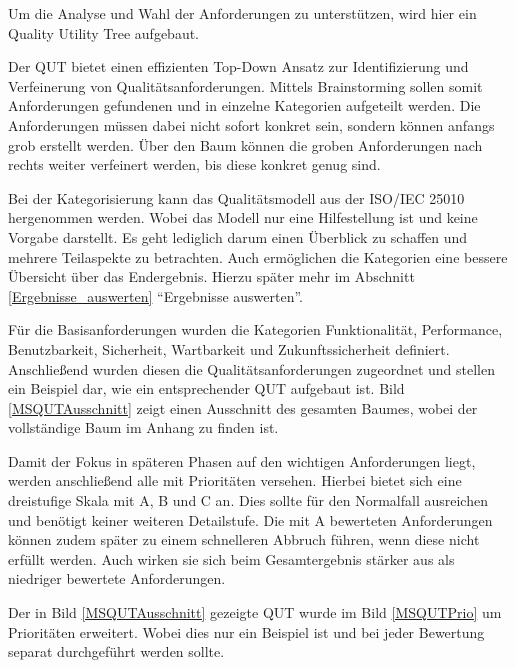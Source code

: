 Um die Analyse und Wahl der Anforderungen zu unterstützen, wird hier ein Quality Utility Tree aufgebaut.


Der \ac{QUT} bietet einen effizienten Top-Down Ansatz zur Identifizierung und Verfeinerung von Qualitätsanforderungen. Mittels Brainstorming sollen somit Anforderungen gefundenen und in einzelne Kategorien aufgeteilt werden. Die Anforderungen müssen dabei nicht sofort konkret sein, sondern können anfangs grob erstellt werden. Über den Baum können die groben Anforderungen nach rechts weiter verfeinert werden, bis diese konkret genug sind. 

Bei der Kategorisierung kann das Qualitätsmodell aus der ISO/IEC 25010 hergenommen werden. Wobei das Modell nur eine Hilfestellung ist und keine Vorgabe darstellt. Es geht lediglich darum einen Überblick zu schaffen und mehrere Teilaspekte zu betrachten. Auch ermöglichen die Kategorien eine bessere Übersicht über das Endergebnis. Hierzu später mehr im Abschnitt \ref{Ergebnisse_auswerten} \enquote{Ergebnisse auswerten}.

Für die Basisanforderungen wurden die Kategorien Funktionalität, Performance, Benutzbarkeit, Sicherheit, Wartbarkeit und Zukunftssicherheit definiert. Anschließend wurden diesen die Qualitätsanforderungen zugeordnet und stellen ein Beispiel dar, wie ein entsprechender \ac{QUT} aufgebaut ist. Bild \ref{MSQUTAusschnitt} zeigt einen Ausschnitt des gesamten Baumes, wobei der vollständige Baum im Anhang zu finden ist. 


Damit der Fokus in späteren Phasen auf den wichtigen Anforderungen liegt, werden anschließend alle mit Prioritäten versehen. Hierbei bietet sich eine dreistufige Skala mit A, B und C an. Dies sollte für den Normalfall ausreichen und benötigt keiner weiteren Detailstufe.
Die mit A bewerteten Anforderungen können zudem später zu einem schnelleren Abbruch führen, wenn diese nicht erfüllt werden. Auch wirken sie sich beim Gesamtergebnis stärker aus als niedriger bewertete Anforderungen. 

Der in Bild \ref{MSQUTAusschnitt} gezeigte \ac{QUT} wurde im Bild \ref{MSQUTPrio} um Prioritäten erweitert. Wobei dies nur ein Beispiel ist und bei jeder Bewertung separat durchgeführt werden sollte.

